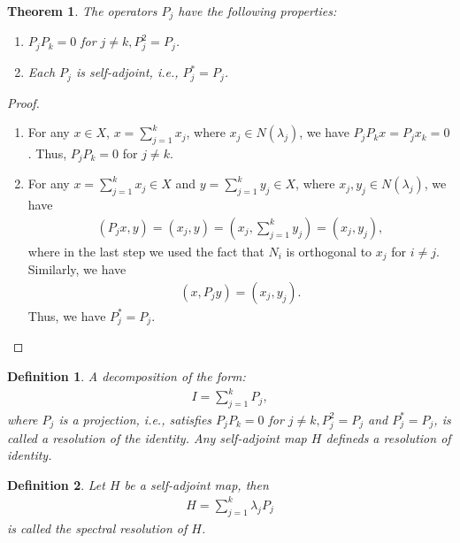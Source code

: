 \documentclass[11pt]{book}
\newtheorem{definition}{Definition}[chapter]
\newtheorem{theorem}{Theorem}[chapter]
\theoremstyle{definition}
\numberwithin{equation}{chapter}
\begin{document}
\begin{theorem}
The operators $P_j$ have the following properties:
\begin{enumerate}[label=(\alph*)]
    \item $P_j P_k = 0$ for $j\neq k, P_j^2 = P_j$.
    \item Each $P_j$ is self-adjoint, i.e., $P_j^* = P_j$.
\end{enumerate}
\end{theorem}
\begin{proof}
~\begin{enumerate}[label=(\alph*)]
    \item For any $x\in X$, $x = \sum^k_{j=1}x_j$, where $x_j\in N(\lambda_j)$, we have $P_j P_k x = P_j x_k = 0$. Thus, $P_j P_k = 0$ for $j\neq k$.
    \item For any $x = \sum^k_{j=1}x_j \in X$ and $y = \sum^k_{j=1}y_j \in X$, where $x_j, y_j \in N(\lambda_j)$, we have
    \begin{align*}
        \left(P_j x, y\right) = \left(x_j, y\right) = \left(x_j, \sum^k_{j=1}y_j\right) = \left(x_j, y_j\right),
    \end{align*}
    where in the last step we used the fact that $N_i$ is orthogonal to $x_j$ for $i\neq j$. Similarly, we have
    \begin{align*}
        \left(x, P_j y\right) = \left(x_j, y_j\right).
    \end{align*}
    Thus, we have $P_j^* = P_j$.
\end{enumerate}
\end{proof}

\medskip

\begin{definition}
A decomposition of the form:
\begin{align*}
    I = \sum^k_{j=1} P_j,
\end{align*}
where $P_j$ is a projection, i.e., satisfies $P_j P_k = 0$ for $j\neq k, P_j^2 = P_j$ and $P_j^* = P_j$, is called a resolution of the identity. Any self-adjoint map $H$ defineds a resolution of identity.
\end{definition}

\medskip

\begin{definition}
Let $H$ be a self-adjoint map, then 
\begin{align*}
    H = \sum^k_{j=1} \lambda_j P_j
\end{align*}
is called the spectral resolution of $H$.
\end{definition}
\end{document}

